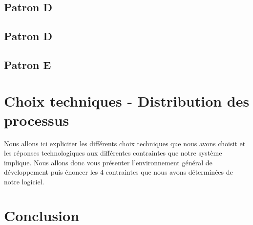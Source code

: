 \subsection{Patron D}

\subsection{Patron D}

\subsection{Patron E}


\section{Choix techniques - Distribution des processus}

\indent Nous allons ici expliciter les différents choix techniques que nous avons choisit et les réponses technologiques aux différentes contraintes que notre système implique. Nous allons donc vous présenter l'environnement général de développement puis énoncer les 4 contraintes que nous avons déterminées de notre logiciel.

%
%



\section{Conclusion}

